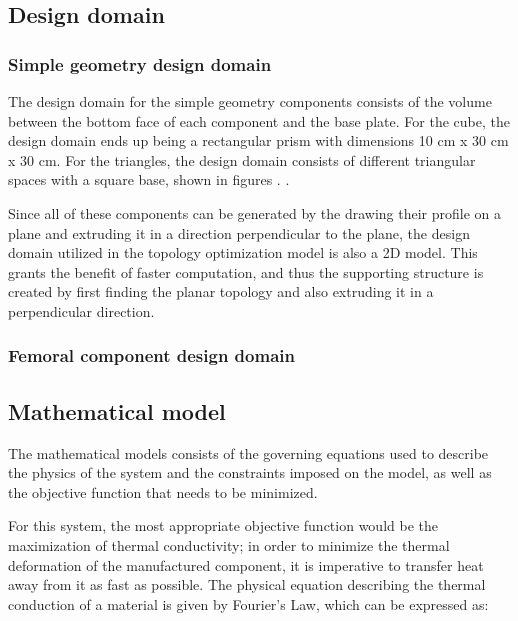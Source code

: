 \documentclass[../main.tex]{subfiles}
\begin{document}
\subsection{Design domain}


\subsubsection{Simple geometry design domain}

The design domain for the simple geometry components consists of the volume between the bottom face of each component and the base plate. For the cube, the design domain ends up being a rectangular prism with dimensions 10 cm x 30 cm x 30 cm. For the triangles, the design domain consists of different triangular spaces with a square base, shown in figures . .

Since all of these components can be generated by the drawing their profile on a plane and extruding it in a direction perpendicular to the plane, the design domain utilized in the topology optimization model is also a 2D model. This grants the benefit of faster computation, and thus the supporting structure is created by first finding the planar topology and also extruding it in a perpendicular direction. 

\subsubsection{Femoral component design domain}

\subsection{Mathematical model}

The mathematical models consists of the governing equations used to describe the physics of the system and the constraints imposed on the model, as well as the objective function that needs to be minimized. 

For this system, the most appropriate objective function would be the maximization of thermal conductivity; in order to minimize the thermal deformation of the manufactured component, it is imperative to transfer heat away from it as fast as possible. The physical equation describing the thermal conduction of a material is given by Fourier's Law, which can be expressed as:
\end{document}

